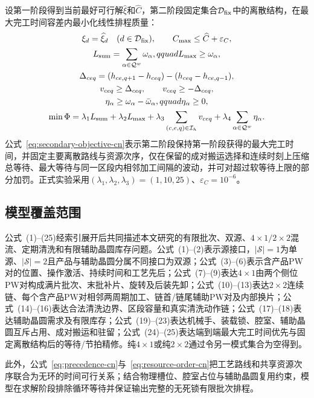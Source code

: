 \documentclass[final,5p,times,twocolumn]{elsarticle}
\begin{document}
设第一阶段得到当前最好可行解$\widehat\xi$和$\widehat C$，第二阶段固定集合$\mathcal D_{\rm fix}$中的离散结构，在最大完工时间容差内最小化线性排程质量：
\begin{equation}
\begin{gathered}
\xi_d=\widehat\xi_d\quad(d\in\mathcal D_{\rm fix}),\qquad
C_{\max}\le\widehat C+\varepsilon_C,\\
L_{\rm sum}=\sum_{\alpha\in\mathcal Q^w}\omega_\alpha,qquad
L_{\max}\ge\omega_\alpha,\\
\Delta_{ceq}=(h_{ce,q+1}-h_{ceq})-(h_{ceq}-h_{ce,q-1}),\\
v_{ceq}\ge\Delta_{ceq},\qquad v_{ceq}\ge-\Delta_{ceq},\\
\eta_\alpha\ge\omega_\alpha-\bar\omega_\alpha,qquad
\eta_\alpha\ge0,\\
\min\Phi=\lambda_1L_{\rm sum}+\lambda_2L_{\max}
+\lambda_3\sum_{(c,e,q)\in\mathcal I_h}v_{ceq}
+\lambda_4\sum_{\alpha\in\mathcal Q^w}\eta_\alpha.
\end{gathered}
\label{eq:secondary-objective-cn}
\end{equation}
公式~\eqref{eq:secondary-objective-cn}表示第二阶段保持第一阶段获得的最大完工时间，并固定主要离散路线与资源次序，仅在保留的成对搬运选择和连续时刻上压缩总等待、最大等待与同一区段内相邻加工间隔的波动，并可对超过软等待上限的部分加罚。正式实验采用$(\lambda_1,\lambda_2,\lambda_3)=(1,10,25)$、$\varepsilon_C=10^{-6}$。

\subsection{模型覆盖范围}

公式~(1)--(25)经索引展开后共同描述本文研究的有限批次、双源、$4\times1/2\times2$混流、定期清洗和有限辅助晶圆库存问题。公式~(1)--(2)表示源接口，$|\mathcal S|=1$为单源、$|\mathcal S|=2$且产品与辅助晶圆分属不同接口为双源；公式~(3)--(6)表示含产品PW对的位置、操作激活、持续时间和工艺先后；公式~(7)--(9)表达$4\times1$由两个侧位PW对构成满片批次、末批补片、旋转及后装先卸；公式~(10)--(13)表达$2\times2$连续链、每个含产品PW对相邻两周期加工、链首/链尾辅助PW对及内部换片；公式~(14)--(16)表达合法清洗边界、区段容量和真实清洗动作链；公式~(17)--(18)表达辅助晶圆需求及有限库存；公式~(19)--(23)表达机械手、装载锁、腔室、辅助晶圆互斥占用、成对搬运和驻留；公式~(24)--(25)表达端到端最大完工时间优先与固定离散结构后的等待/节拍精修。纯$4\times1$或纯$2\times2$通过令另一模式集合为空得到。

此外，公式~\eqref{eq:precedence-cn}与~\eqref{eq:resource-order-cn}把工艺路线和共享资源次序联合为无环的时间可行关系；结合物理槽位、腔室占位与辅助晶圆复用约束，模型在求解阶段排除循环等待并保证输出完整的无死锁有限批次排程。
\end{document}
